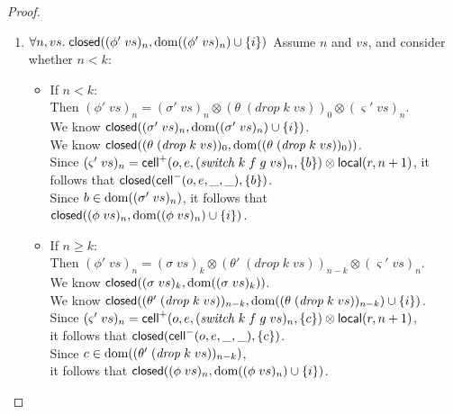 \begin{proof}
\begin{enumerate}
\item $\forall n, vs.\; \mathsf{closed}({(\phi'\;vs)_n}, {\mbox{dom}({(\phi'\;vs)_n}) \cup \{{i}\}})$ 
  Assume $n$ and $vs$, and consider whether $n < k$:
  \begin{itemize}
  \item If $n < k$: \\ 
    Then $(\phi'\;vs)_n = (\sigma'\;vs)_{n} \otimes (\theta\;(\mathit{drop}\;k\;vs))_0 \otimes (\varsigma'\;vs)_{n}$. \\
    We know $\mathsf{closed}({(\sigma'\;vs)_{n}}, {\mbox{dom}({(\sigma'\;vs)_{n}}) \cup \{{i}\}})$. \\
    We know $\mathsf{closed}({(\theta\;(\mathit{drop}\;k\;vs))_0}, {\mbox{dom}({(\theta\;(\mathit{drop}\;k\;vs))_0})})$. \\
    Since $(\varsigma'\;vs)_n = \mathsf{cell}^{+}({o}, {e}, {(\mathit{switch}\;k\;f\;g\;vs)_n}, {\{{b}\}}) \otimes \mathsf{local}({r}, {n+1})$, it follows that $\mathsf{closed}({\mathsf{cell}^{-}({o}, {e}, {\_}, {\_})}, {\{{b}\}})$. \\
    Since $b \in \mbox{dom}({(\sigma'\;vs)_{n}})$,  it follows that $\mathsf{closed}({(\phi\;vs)_n}, {\mbox{dom}({(\phi\;vs)_n}) \cup \{{i}\}})$. 
  \item If $n \geq k$: \\ 
    Then $(\phi'\;vs)_n = (\sigma\;vs)_k \otimes (\theta'\;(\mathit{drop}\;k\;vs))_{n-k} \otimes (\varsigma'\;vs)_{n}$. \\
    We know $\mathsf{closed}({(\sigma\;vs)_{k}}, {\mbox{dom}({(\sigma\;vs)_{k}})})$. \\
    We know $\mathsf{closed}({(\theta'\;(\mathit{drop}\;k\;vs))_{n-k}}, {\mbox{dom}({(\theta\;(\mathit{drop}\;k\;vs))_{n-k}}) \cup \{{i}\}})$. \\
    Since $(\varsigma'\;vs)_n = \mathsf{cell}^{+}({o}, {e}, {(\mathit{switch}\;k\;f\;g\;vs)_n}, {\{{c}\}}) \otimes \mathsf{local}({r}, {n+1})$, \\
    it follows that $\mathsf{closed}({\mathsf{cell}^{-}({o}, {e}, {\_}, {\_})}, {\{{c}\}})$. \\
    Since $c \in \mbox{dom}({(\theta'\;(\mathit{drop}\;k\;vs))_{n-k}})$, \\
    it follows that $\mathsf{closed}({(\phi\;vs)_n}, {\mbox{dom}({(\phi\;vs)_n}) \cup \{{i}\}})$. 
  \end{itemize}



\end{enumerate}
\end{proof}
